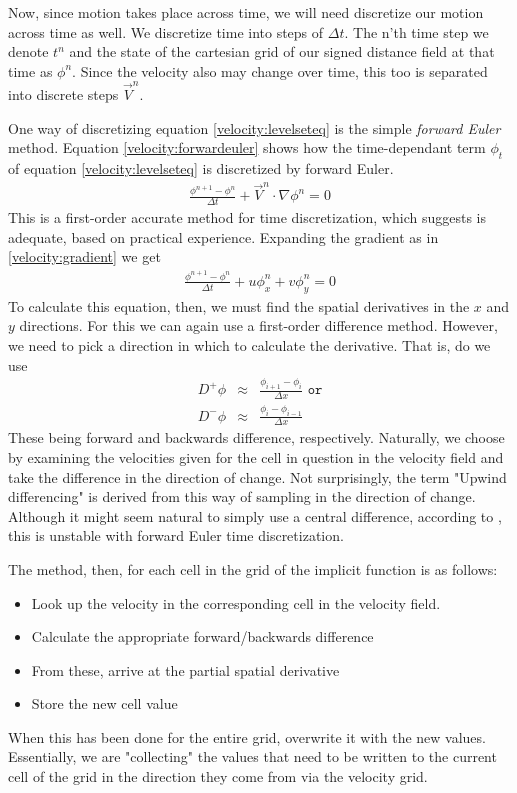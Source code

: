 Now, since motion takes place across time, we will need discretize our
motion across time as well. We discretize time into steps of $\Delta
t$. The n'th time step we denote $t^n$ and the state of the cartesian
grid of our signed distance field at that time as $\phi^n$. Since the
velocity also may change over time, this too is separated into
discrete steps $\vec{V}^n$.

One way of discretizing equation \ref{velocity:levelseteq} is the simple \emph{forward Euler} method. Equation \vref{velocity:forwardeuler} shows how the time-dependant term $\phi_t$ of equation \ref{velocity:levelseteq} is discretized by forward Euler. 
\begin{eqnarray}
\label{velocity:forwardeuler}
\frac{\phi^{n+1}-\phi^n}{\Delta t}+\vec{V}^n\cdot\nabla\phi^n = 0
\end{eqnarray}
This is a first-order accurate method for time discretization, which  suggests is adequate, based on practical experience.
Expanding the gradient as in \vref{velocity:gradient} we get
\begin{eqnarray}
\label{velocity:forwardeuler}
\frac{\phi^{n+1}-\phi^n}{\Delta t}+u\phi_{x}^n + v\phi_{y}^n = 0
\end{eqnarray}
To calculate this equation, then, we must find the spatial derivatives
in the $x$ and $y$ directions. For this we can again use a first-order
difference method. However, we need to pick a direction in which to
calculate the derivative. That is, do we use
\begin{eqnarray}
D^+\phi &\approx & \frac{\phi_{i+1} - \phi_i}{\Delta x} \texttt{ or}\\
D^-\phi &\approx & \frac{\phi_i - \phi_{i-1}}{\Delta x}
\end{eqnarray}
These being forward and backwards difference, respectively. Naturally, we choose by examining the velocities given for the cell in question in the velocity field and take the difference in the direction of change. Not surprisingly, the term "Upwind differencing" is derived from this way of sampling in the direction of change. 
Although it might seem natural to simply use a central difference, according to , this is unstable with forward Euler time discretization.

The method, then, for each cell in the grid of the implicit function is as follows:
\begin{itemize}
\item Look up the velocity in the corresponding cell in the velocity field.
\item Calculate the appropriate forward/backwards difference
\item From these, arrive at the partial spatial derivative
\item Store the new cell value
\end{itemize}
When this has been done for the entire grid, overwrite it with the new values.
Essentially, we are "collecting" the values that need to be written to the current cell of the grid in the direction they come from via the velocity grid.


